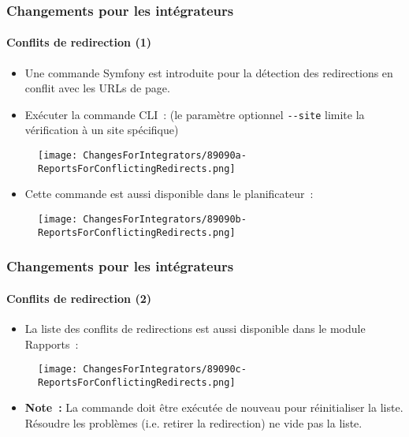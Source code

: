 \begin{frame}[fragile]
	\frametitle{Changements pour les intégrateurs}
	\framesubtitle{Conflits de redirection (1)}

	\begin{itemize}
		\item Une commande Symfony est introduite pour la détection des redirections
			en conflit avec les URLs de page.
		\item Exécuter la commande CLI~:\newline
			\smaller
				(le paramètre optionnel \texttt{-}\texttt{-site} limite la vérification à un site spécifique)
			\normalsize
	\end{itemize}

	\begin{figure}
		\texttt{[image: ChangesForIntegrators/89090a-ReportsForConflictingRedirects.png]}
	\end{figure}

	\begin{itemize}
		\item Cette commande est aussi disponible dans le planificateur~:
	\end{itemize}

	\begin{figure}
		\texttt{[image: ChangesForIntegrators/89090b-ReportsForConflictingRedirects.png]}
	\end{figure}

\end{frame}


\begin{frame}[fragile]
	\frametitle{Changements pour les intégrateurs}
	\framesubtitle{Conflits de redirection (2)}

	\begin{itemize}
		\item La liste des conflits de redirections est aussi disponible dans le module Rapports~:
	\end{itemize}

	\begin{figure}
		\texttt{[image: ChangesForIntegrators/89090c-ReportsForConflictingRedirects.png]}
	\end{figure}

	\begin{itemize}
		\item
			\small\textbf{Note~:}
				La commande doit être exécutée de nouveau pour réinitialiser la liste.
				Résoudre les problèmes (i.e. retirer la redirection) ne vide pas la liste.
			\normalsize
	\end{itemize}

\end{frame}

